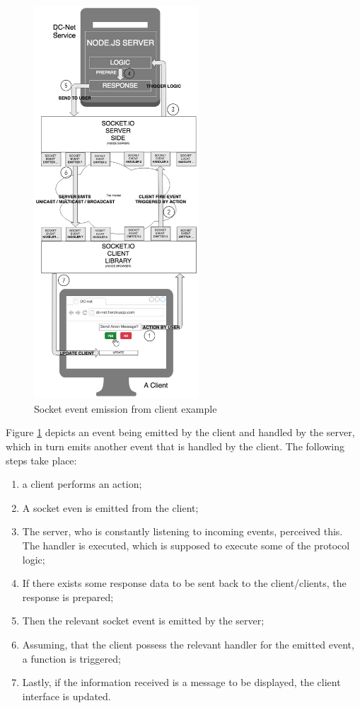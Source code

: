\begin{figure}[H]
    \centering
    \includegraphics[width=0.55\textwidth]{Images/Design/socketEventEmission.png}
    \caption{Socket event emission from client example}
    \label{fig:socketEventEmission}
\end{figure}

Figure \ref{fig:socketEventEmission} depicts an event being emitted by the client and handled by the server, which in turn emits another event that is handled by the client. The following steps take place:
\begin{enumerate}
    \item a client performs an action;
    \item A socket even is emitted from the client;
    \item The server, who is constantly listening to incoming events, perceived this. The handler is executed, which is supposed to execute some of the protocol logic;
    \item If there exists some response data to be sent back to the client/clients, the response is prepared;
    \item Then the relevant socket event is emitted by the server;
    \item Assuming, that the client possess the relevant handler for the emitted event, a function is triggered;
    \item Lastly, if the information received is a message to be displayed, the client interface is updated.
\end{enumerate}
  

